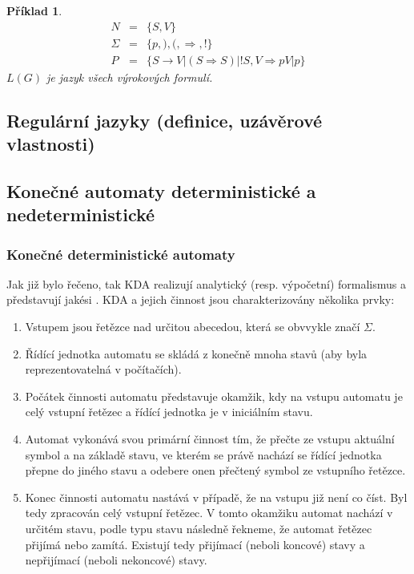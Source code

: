\documentclass[10pt,a4paper]{article}
\theoremstyle{note}
\newtheorem{priklad}{Příklad}
\begin{document}
\begin{priklad}
\begin{eqnarray*}
N &=& \lbrace S, V \rbrace \\
\Sigma &=& \lbrace p,),(, \Rightarrow, ! \rbrace \\
P &=& \lbrace S \rightarrow V|(S \Rightarrow S)|!S, V \Rightarrow pV|p \rbrace
\end{eqnarray*}
$L(G)$ je jazyk všech výrokových formulí.
\end{priklad}


	\subsection{Regulární jazyky (definice, uzávěrové vlastnosti)}
	\subsection{Konečné automaty deterministické a nedeterministické}

\subsubsection{Konečné deterministické automaty}

Jak již bylo řečeno, tak KDA realizují analytický (resp. výpočetní) formalismus a představují jakési .
KDA a jejich činnost jsou charakterizovány několika prvky:
\begin{enumerate}
\item
Vstupem jsou řetězce nad určitou abecedou, která se obvvykle značí $\Sigma$.

\item
Řídící jednotka automatu se skládá z konečně mnoha stavů (aby byla reprezentovatelná v počítačích).

\item
Počátek činnosti automatu představuje okamžik, kdy na vstupu automatu je celý vstupní řetězec a
řídící jednotka je v iniciálním stavu.

\item
Automat vykonává svou primární činnost tím, že přečte ze vstupu aktuální symbol a na základě stavu, ve kterém se právě
nachází se řídící jednotka přepne do jiného stavu a odebere onen přečtený symbol ze vstupního řetězce.

\item
Konec činnosti automatu nastává v případě, že na vstupu již není co číst. Byl tedy zpracován celý
vstupní řetězec. V tomto okamžiku automat nachází v určitém stavu, podle typu stavu následně řekneme, že
automat řetězec přijímá nebo zamítá. Existují tedy přijímací (neboli koncové) stavy a nepřijímací (neboli nekoncové) stavy.
\end{enumerate}
\end{document}

